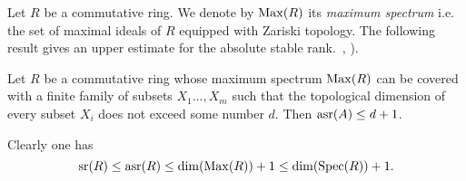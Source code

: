 Let $R$ be a commutative ring. We denote by $\operatorname{Max}(R)$ its {\it maximum spectrum} i.e. the set of maximal ideals of $R$ equipped with Zariski topology.
The following result gives an upper estimate for the absolute stable rank.~\cite[Theorem~2.3]{EO}, \cite[Theorem~3.7]{MKV}).
\begin{thm} Let $R$ be a commutative ring whose maximum spectrum 
$\operatorname{Max}(R)$ can be covered with a finite family of subsets $X_1\ldots, X_m$ such that the topological dimension of every subset $X_i$
does not exceed some number $d$. Then $\operatorname{asr}(A)\leq d+1$. \end{thm}
Clearly one has \begin{equation}\nonumber \operatorname{sr}(R)\leq \operatorname{asr}(R)\leq \dim(\operatorname{Max}(R))+1\leq \dim(\operatorname{Spec}(R))+1.\end{equation}